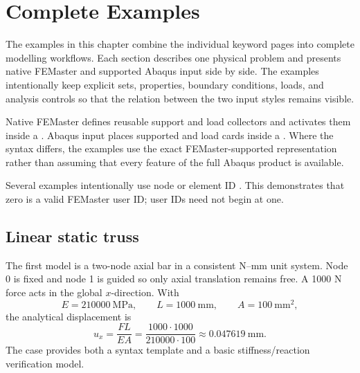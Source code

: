\chapter{Complete Examples}
\label{chap:complete-examples}

The examples in this chapter combine the individual keyword pages into complete modelling workflows. Each section describes one physical problem and presents native FEMaster and supported Abaqus input side by side. The examples intentionally keep explicit sets, properties, boundary conditions, loads, and analysis controls so that the relation between the two input styles remains visible.

Native FEMaster defines reusable support and load collectors and activates them inside a . Abaqus input places supported  and load cards inside a . Where the syntax differs, the examples use the exact FEMaster-supported representation rather than assuming that every feature of the full Abaqus product is available.

Several examples intentionally use node or element ID . This demonstrates that zero is a valid FEMaster user ID; user IDs need not begin at one.

\section{Linear static truss}

The first model is a two-node axial bar in a consistent N--mm unit system. Node 0 is fixed and node 1 is guided so only axial translation remains free. A 1000 N force acts in the global \(x\)-direction. With
\[
E=210000\ \mathrm{MPa},\qquad
L=1000\ \mathrm{mm},\qquad
A=100\ \mathrm{mm}^2,
\]
the analytical displacement is
\[
u_x=\frac{FL}{EA}
=\frac{1000\cdot1000}{210000\cdot100}
\approx0.047619\ \mathrm{mm}.
\]
The case provides both a syntax template and a basic stiffness/reaction verification model.

